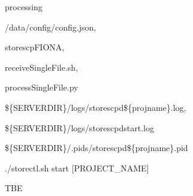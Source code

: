 \documentclass[letterpaper,10pt,english]{sphinxmanual}
\begin{document}
\begin{DUlineblock}{0em}
\item[] \sphinxhyphen{}  processing
\item[] \sphinxhyphen{} 
\item[]
\begin{DUlineblock}{\DUlineblockindent}
\item[] \sphinxhyphen{} /data/config/config.json,
\item[] \sphinxhyphen{} storescpFIONA,
\item[] \sphinxhyphen{} receiveSingleFile.sh,
\item[] \sphinxhyphen{} processSingleFile.py
\end{DUlineblock}
\item[] \sphinxhyphen{} 
\item[]
\begin{DUlineblock}{\DUlineblockindent}
\item[] \sphinxhyphen{} \$\{SERVERDIR\}/logs/storescpd\$\{projname\}.log,
\item[] \sphinxhyphen{} \$\{SERVERDIR\}/logs/storescpd\sphinxhyphen{}start.log
\end{DUlineblock}
\item[] \sphinxhyphen{}  \$\{SERVERDIR\}/.pids/storescpd\$\{projname\}.pid
\item[] \sphinxhyphen{}  ./storectl.sh start {[}PROJECT\_NAME{]}
\item[] \sphinxhyphen{}  TBE
\end{DUlineblock}

\sphinxAtStartPar
{}


\sphinxAtStartPar
{}
\end{document}
